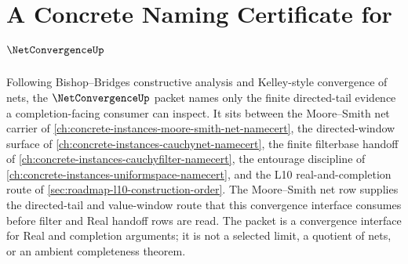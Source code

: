\chapter{A Concrete Naming Certificate for $\NetConvergenceUp$}
\label{ch:concrete-instances-netconvergence-namecert}

Following Bishop--Bridges constructive analysis and Kelley-style convergence of nets, the $\NetConvergenceUp$ packet names only the finite directed-tail evidence a completion-facing consumer can inspect. It sits between the Moore--Smith net carrier of \autoref{ch:concrete-instances-moore-smith-net-namecert}, the directed-window surface of \autoref{ch:concrete-instances-cauchynet-namecert}, the finite filterbase handoff of \autoref{ch:concrete-instances-cauchyfilter-namecert}, the entourage discipline of \autoref{ch:concrete-instances-uniformspace-namecert}, and the L10 real-and-completion route of \autoref{sec:roadmap-l10-construction-order}. The Moore--Smith net row supplies the directed-tail and value-window route that this convergence interface consumes before filter and Real handoff rows are read. The packet is a convergence interface for Real and completion arguments; it is not a selected limit, a quotient of nets, or an ambient completeness theorem.

